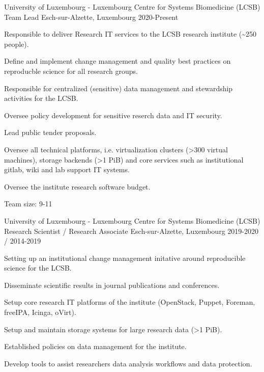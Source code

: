 \begin{cventries}
  \cventry
    {University of Luxembourg - Luxembourg Centre for Systems Biomedicine (LCSB)} %
    {Team Lead} %
    {Esch-sur-Alzette, Luxembourg} %
    {2020-Present} %
    {
      \begin{cvitems} %
        \item {Responsible to deliver Research IT services to the LCSB research institute (\textasciitilde 250 people).}
        \item {Define and implement change management and quality best practices on reproducble science for all research groups.}
        \item {Responsible for centralized (sensitive) data management and stewardship activities for the LCSB.}
        \item {Oversee policy development for sensitive reserch data and IT security.}
        \item {Lead public tender proposals.}
        \item {Oversee all technical platforms, i.e. virtualization clusters (\textgreater 300 virtual machines), storage backends (\textgreater 1 PiB) and core services such as institutional gitlab, wiki and lab support IT systems.}
        \item {Oversee the institute research software budget.}
        \item {Team size: 9-11}
      \end{cvitems}
    }

  \cventry
    {University of Luxembourg - Luxembourg Centre for Systems Biomedicine (LCSB)} %
    {Research Scientist / Research Associate} %
    {Esch-sur-Alzette, Luxembourg} %
    {2019-2020 / 2014-2019} %
    {
      \begin{cvitems} %
        \item {Setting up an institutional change management initative around reproducible science for the LCSB.}
        \item {Disseminate scientific results in journal publications and conferences.}
        \item {Setup core research IT platforms of the institute (OpenStack, Puppet, Foreman, freeIPA, Icinga, oVirt).}
        \item {Setup and maintain storage systems for large research data (\textgreater 1 PiB).}
        \item {Established policies on data management for the institute.}
        \item {Develop tools to assist researchers data analysis workflows and data protection.}
      \end{cvitems}
    }


\end{cventries}

